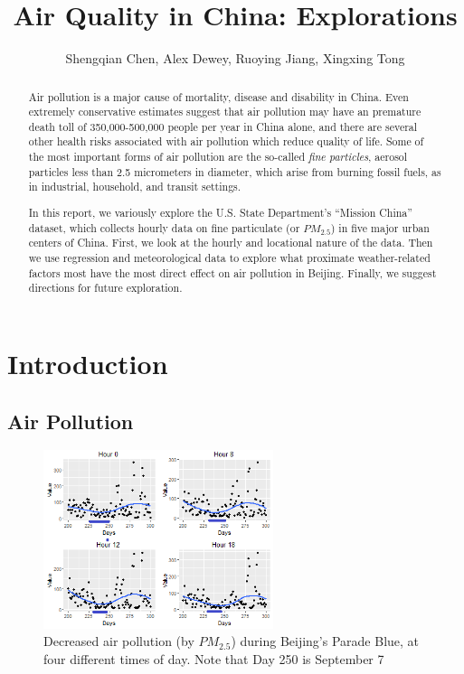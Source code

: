 \documentclass[11pt]{article} %
\title{\textbf{Air Quality in China: Explorations}}
\author{Shengqian Chen, Alex Dewey, Ruoying Jiang, Xingxing Tong}
\begin{document}
\maketitle

\begin{abstract}
Air pollution is a major cause of mortality, disease and disability in China.
Even extremely conservative estimates suggest that air pollution may have an 
premature death toll of 350,000-500,000 people per year in China alone,
and there are several other health risks associated with air pollution which reduce quality of life. 
Some of the most important forms of air pollution are the so-called \textit{fine particles}, aerosol particles
less than 2.5 micrometers in diameter, which arise from burning fossil fuels, as in
industrial, household, and transit settings.

In this report, we variously explore the U.S. State Department's ``Mission China'' dataset, which 
collects hourly data on fine particulate (or \(PM_{2.5}\)) in five major urban centers of China. First, we look at the hourly and locational
nature of the data. Then we use regression and meteorological data to explore what proximate weather-related
factors most have the most direct effect on air pollution in Beijing. Finally, we suggest
directions for future exploration.
\end{abstract}

\section{Introduction}

\subsection{Air Pollution}
\begin{figure}[!ht]
  \centering
    \includegraphics[width=0.6\textwidth]{ParadeBlueBeijing}
      \caption{Decreased air pollution (by \(\mathit{PM_{2.5}}\)) during Beijing's Parade Blue, at four different times of day.
      Note that Day 250 is September 7}
\end{figure}
\end{document}
